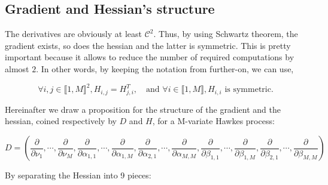 \documentclass[11pt]{book}
\begin{document}
\frontmatter
\pagestyle{front}


\newpage




\thispagestyle{empty}%

                                                                







\mainmatter
\pagestyle{main}







\subsection{Gradient and Hessian's structure}
The derivatives are obviously at least $\mathcal C^2$. Thus, by using Schwartz theorem, the gradient exists, so does the hessian and the latter is symmetric. This is pretty important because it allows to reduce the number of required computations by almost $2$. In other words, by keeping the notation from further-on, we can use, 

$$\forall i,j \in  \llbracket 1, M \rrbracket ^ 2,  H_{i,j} = H_{j,i}^T, \quad \text{and  } \forall i \in  \llbracket 1, M \rrbracket, H_{i,i} \text{ is symmetric.} $$


Hereinafter we draw a proposition for the structure of the gradient and the hessian, coined respectively by $D$ and $H$, for a M-variate Hawkes process:

\begin{equation}
D = \left ( 
\frac{\partial } {\partial \nu_1}, \cdots, \frac{\partial } {\partial \nu_M}
, 
\frac{\partial } {\partial \alpha_{1,1}},  \cdots, 
\frac{\partial } {\partial \alpha_{1,M}}, 
\frac{\partial } {\partial  \alpha_{2,1}}, \cdots, 
\frac{\partial } {\partial  \alpha_{M,M}}, 
\frac{\partial } {\partial  \beta_{1,1}}, \cdots, 
\frac{\partial } {\partial  \beta_{1,M}}, 
\frac{\partial } {\partial \beta_{2,1}}, \cdots, 
\frac{\partial } {\partial  \beta_{M,M}}  \right ) 
\end{equation}

By separating the Hessian into 9 pieces:
\end{document}
